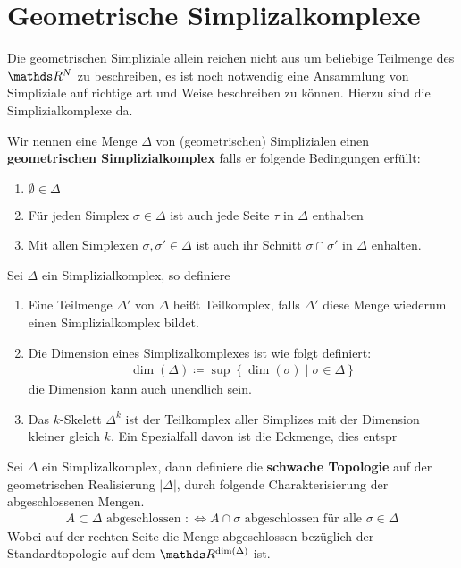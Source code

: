 
\section{Geometrische Simplizalkomplexe}

Die geometrischen Simpliziale allein reichen nicht aus um beliebige 
Teilmenge des $\R^N$ zu beschreiben, es ist noch notwendig eine Ansammlung
von Simpliziale auf richtige art und Weise beschreiben zu können. Hierzu
sind die Simplizialkomplexe da.

\begin{Def}
	Wir nennen eine Menge $\Delta$ von (geometrischen) Simplizialen einen \textbf{geometrischen Simplizialkomplex}
	falls er folgende Bedingungen erfüllt:
	\begin{enumerate}[(K1)]
		\item $\emptyset \in \Delta$
		\item Für jeden Simplex $\sigma \in \Delta$ ist auch jede Seite
		$\tau$ in $\Delta$ enthalten
		\item Mit allen Simplexen $\sigma, \sigma' \in \Delta$ ist auch ihr
		Schnitt $\sigma \cap \sigma'$ in $\Delta$ enhalten.
	\end{enumerate}
\end{Def}

\begin{Def}
	Sei $\Delta$ ein Simplizialkomplex, so definiere
	\begin{enumerate}[1)]
		\item Eine Teilmenge $\Delta'$ von $\Delta$ heißt Teilkomplex, falls
		$\Delta'$ diese Menge wiederum einen Simplizialkomplex bildet.
		\item Die Dimension eines Simplizalkomplexes ist wie folgt
		definiert:
		\begin{gather*}
			\dim(\Delta) \coloneqq \sup \left\{ \dim(\sigma) \; \Big| \;
			\sigma \in \Delta \right\}
		\end{gather*}
		die Dimension kann auch unendlich sein.
		\item Das $k$-Skelett $\Delta^k$ ist der Teilkomplex aller Simplizes
		mit der Dimension kleiner gleich $k$.  Ein Spezialfall davon ist
		die Eckmenge, dies entspr
	\end{enumerate}
\end{Def}

\begin{Def}
	Sei $\Delta$ ein Simplizalkomplex, dann definiere die
	\textbf{schwache Topologie} auf der geometrischen Realisierung $| \Delta |$,
	durch folgende Charakterisierung der abgeschlossenen Mengen.
	\begin{gather*}
		A \subset \Delta \text{ abgeschlossen } :\Leftrightarrow A \cap
		\sigma \text{ abgeschlossen für alle } \sigma \in \Delta
	\end{gather*}
	Wobei auf der rechten Seite die Menge abgeschlossen bezüglich der
	Standardtopologie auf dem $\R^{\dim(\Delta)}$ ist.
\end{Def}


